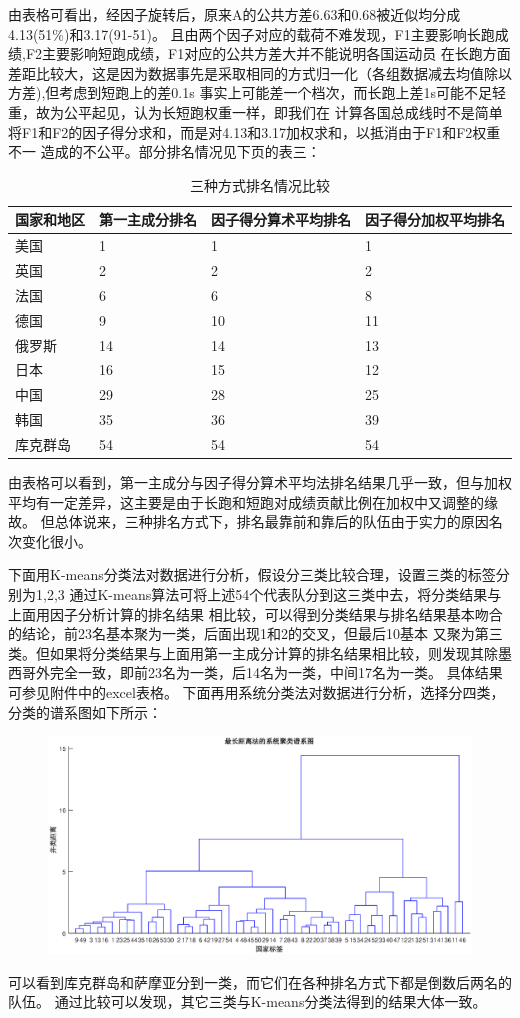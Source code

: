 \documentclass[10pt]{article}
\begin{document}
\begin{CJK}{GBK}{song}
由表格可看出，经因子旋转后，原来A的公共方差6.63和0.68被近似均分成4.13(51\%)和3.17(91-51)。
且由两个因子对应的载荷不难发现，F1主要影响长跑成绩,F2主要影响短跑成绩，F1对应的公共方差大并不能说明各国运动员
在长跑方面差距比较大，这是因为数据事先是采取相同的方式归一化（各组数据减去均值除以方差),但考虑到短跑上的差0.1s
事实上可能差一个档次，而长跑上差1s可能不足轻重，故为公平起见，认为长短跑权重一样，即我们在
计算各国总成线时不是简单将F1和F2的因子得分求和，而是对4.13和3.17加权求和，以抵消由于F1和F2权重不一
造成的不公平。部分排名情况见下页的表三：
\begin{table}[!h]
\centering
\caption{三种方式排名情况比较}
\begin{tabular}{llll}
\hline
国家和地区 & 第一主成分排名 & 因子得分算术平均排名 & 因子得分加权平均排名\\
\hline
美国 & 1 & 1 &1\\
英国 & 2 & 2 &2\\
法国 & 6 & 6 &8\\
德国 & 9 & 10&11\\
俄罗斯 &14 &14&13\\
日本 & 16 &15&12\\
中国 & 29 &28&25\\
韩国 & 35 & 36&39\\
库克群岛 &54 &54&54\\
\hline
\end{tabular}
\end{table}
由表格可以看到，第一主成分与因子得分算术平均法排名结果几乎一致，但与加权平均有一定差异，这主要是由于长跑和短跑对成绩贡献比例在加权中又调整的缘故。
但总体说来，三种排名方式下，排名最靠前和靠后的队伍由于实力的原因名次变化很小。

下面用K-means分类法对数据进行分析，假设分三类比较合理，设置三类的标签分别为1,2,3
通过K-means算法可将上述54个代表队分到这三类中去，将分类结果与上面用因子分析计算的排名结果 
相比较，可以得到分类结果与排名结果基本吻合的结论，前23名基本聚为一类，后面出现1和2的交叉，但最后10基本
又聚为第三类。但如果将分类结果与上面用第一主成分计算的排名结果相比较，则发现其除墨西哥外完全一致，即前23名为一类，后14名为一类，中间17名为一类。
具体结果可参见附件中的excel表格。
下面再用系统分类法对数据进行分析，选择分四类，分类的谱系图如下所示：

\begin{figure}[!ht]
\centering
\includegraphics[scale=0.5]{dendrogram.eps}
\end{figure}

可以看到库克群岛和萨摩亚分到一类，而它们在各种排名方式下都是倒数后两名的队伍。
通过比较可以发现，其它三类与K-means分类法得到的结果大体一致。
\end{CJK}
\end{document}
